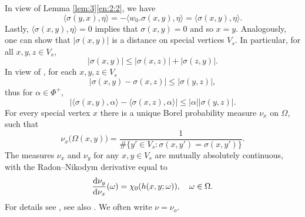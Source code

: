 \documentclass[11pt]{amsart}
\newcommand{\sprod}[2]{\langle {#1}, {#2} \rangle}
\theoremstyle{plain}
\theoremstyle{definition}
\numberwithin{equation}{section}
\begin{document}
In view of Lemma \ref{lem:3}\eqref{en:2:2}, we have
\[
	\sprod{\sigma(y, x)}{\eta} = -\sprod{w_0 . \sigma(x, y)}{\eta} =
	\sprod{\sigma(x, y)}{\eta}.
\]
Lastly, $\sprod{\sigma(x, y)}{\eta} = 0$ implies that $\sigma(x, y) = 0$ and so $x = y$. Analogously, one can show that
$|\sigma(x, y)|$ is a distance on special vertices $V_s$. In particular, for all $x, y, z \in V_s$,
\begin{equation}
	\label{eq:83}
	|\sigma(x, y)| \leqslant |\sigma(x, z)| + |\sigma(z, y)|.
\end{equation}
In view of \cite[Lemma 3.1]{RemyTrojan}, for each $x, y, z \in V_s$
\begin{equation}
	\label{eq:14}
	|\sigma(x, y) -\sigma(x, z)| \leq |\sigma(y, z)|,
\end{equation}
thus for $\alpha \in \Phi^+$, 
\begin{equation}
	\label{eq:11}
	|\sprod{\sigma(x, y)}{\alpha} - \sprod{\sigma(x, z)}{\alpha}| \leq |\alpha| |\sigma(y, z)|.
\end{equation}
For every special vertex $x$ there is a unique Borel probability measure $\nu_x$ on $\Omega$, such that
\[
	\nu_x\big(\Omega(x, y)\big) = \frac{1}{\#\{y' \in V_s : \sigma(x, y') = \sigma(x, y')\}}.
\]
The measures $\nu_x$ and $\nu_y$ for any $x, y \in V_s$ are mutually absolutely continuous, with the Radon--Nikodym derivative 
equal to
\begin{equation}
	\label{eq:15}
	\frac{{\rm d} \nu_y}{\mathrm{d} \nu_x}(\omega)
	=\chi_0(h(x, y; \omega)), \quad \omega \in \Omega.
\end{equation}
For details see \cite[page 16]{park2}, see also \cite[Proposition 6.1]{RemyTrojan}. We often write $\nu = \nu_o$.
\end{document}
